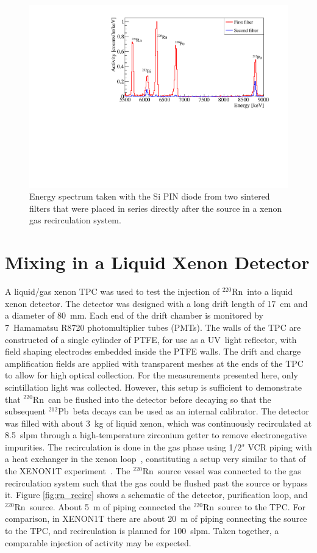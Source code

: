 \begin{figure}[htb]
\centering
    \includegraphics[trim = 5 0 40 20, clip = true,width = 0.8\columnwidth]{figures/rnsource/twofilters}
    \caption{Energy spectrum taken with the Si PIN diode from two sintered filters that were placed in series directly after the source in a xenon gas recirculation system.}\label{fig:twofilters}
\end{figure}

\section{Mixing in a Liquid Xenon Detector}

A liquid/gas xenon TPC was used to test the injection of $^{220}$Rn~into a liquid xenon detector. The detector was designed with a long drift length of 17~cm and a diameter of 80~mm. Each end of the drift chamber is monitored by 7~Hamamatsu R8720 photomultiplier tubes (PMTs). The walls of the TPC are constructed of a single cylinder of PTFE, for use as a UV~light reflector, with field shaping electrodes embedded inside the PTFE walls. The drift and charge amplification fields are applied with transparent meshes at the ends of the TPC to allow for high optical collection. For the measurements presented here, only scintillation light was collected. However, this setup is sufficient to demonstrate that $^{220}$Rn~can be flushed into the detector before decaying so that the subsequent $^{212}$Pb~beta decays can be used as an internal calibrator. The detector was filled with about 3~kg of liquid xenon, which was continuously recirculated at 8.5~slpm through a high-temperature zirconium getter to remove electronegative impurities. The recirculation is done in the gas phase using 1/2" VCR piping with a heat exchanger in the xenon loop~\cite{Giboni:2011wx}, constituting a setup very similar to that of the XENON1T experiment~\cite{Aprile:2017aty}. The $^{220}$Rn~source vessel was connected to the gas recirculation system such that the gas could be flushed past the source or bypass it. Figure \ref{fig:rn_recirc} shows a schematic of the detector, purification loop, and $^{220}$Rn~source. About 5~m of piping connected the $^{220}$Rn~source to the TPC. For comparison, in XENON1T there are about 20~m of piping connecting the source to the TPC, and recirculation is planned for 100~slpm. Taken together, a comparable injection of activity may be expected.

